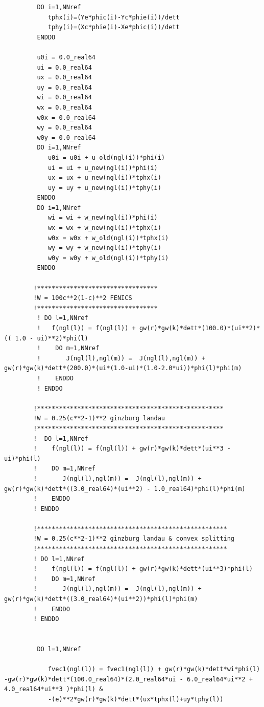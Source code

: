 \documentclass{article}
\begin{document}
\begin{verbatim}
         DO i=1,NNref
            tphx(i)=(Ye*phic(i)-Yc*phie(i))/dett
            tphy(i)=(Xc*phie(i)-Xe*phic(i))/dett
         ENDDO

         u0i = 0.0_real64
         ui = 0.0_real64
         ux = 0.0_real64
         uy = 0.0_real64
         wi = 0.0_real64
         wx = 0.0_real64
         w0x = 0.0_real64
         wy = 0.0_real64
         w0y = 0.0_real64
         DO i=1,NNref
            u0i = u0i + u_old(ngl(i))*phi(i)
            ui = ui + u_new(ngl(i))*phi(i) 
            ux = ux + u_new(ngl(i))*tphx(i)
            uy = uy + u_new(ngl(i))*tphy(i)
         ENDDO
         DO i=1,NNref
            wi = wi + w_new(ngl(i))*phi(i) 
            wx = wx + w_new(ngl(i))*tphx(i)
            w0x = w0x + w_old(ngl(i))*tphx(i)
            wy = wy + w_new(ngl(i))*tphy(i)
            w0y = w0y + w_old(ngl(i))*tphy(i)
         ENDDO
         
        !*********************************
        !W = 100c**2(1-c)**2 FENICS
        !*********************************  
         ! DO l=1,NNref
         !   f(ngl(l)) = f(ngl(l)) + gw(r)*gw(k)*dett*(100.0)*(ui**2)*(( 1.0 - ui)**2)*phi(l)
         !    DO m=1,NNref
         !       J(ngl(l),ngl(m)) =  J(ngl(l),ngl(m)) + gw(r)*gw(k)*dett*(200.0)*(ui*(1.0-ui)*(1.0-2.0*ui))*phi(l)*phi(m)
         !    ENDDO
         ! ENDDO

        !***************************************************
        !W = 0.25(c**2-1)**2 ginzburg landau 
        !*************************************************** 
        !  DO l=1,NNref
        !    f(ngl(l)) = f(ngl(l)) + gw(r)*gw(k)*dett*(ui**3 - ui)*phi(l)
        !    DO m=1,NNref
        !       J(ngl(l),ngl(m)) =  J(ngl(l),ngl(m)) + gw(r)*gw(k)*dett*((3.0_real64)*(ui**2) - 1.0_real64)*phi(l)*phi(m)
        !    ENDDO
        ! ENDDO
        
        !****************************************************
        !W = 0.25(c**2-1)**2 ginzburg landau & convex splitting
        !**************************************************** 
        ! DO l=1,NNref
        !    f(ngl(l)) = f(ngl(l)) + gw(r)*gw(k)*dett*(ui**3)*phi(l)
        !    DO m=1,NNref
        !       J(ngl(l),ngl(m)) =  J(ngl(l),ngl(m)) + gw(r)*gw(k)*dett*((3.0_real64)*(ui**2))*phi(l)*phi(m)
        !    ENDDO
        ! ENDDO

         
         DO l=1,NNref
            
            fvec1(ngl(l)) = fvec1(ngl(l)) + gw(r)*gw(k)*dett*wi*phi(l) -gw(r)*gw(k)*dett*(100.0_real64)*(2.0_real64*ui - 6.0_real64*ui**2 + 4.0_real64*ui**3 )*phi(l) &
            -(e)**2*gw(r)*gw(k)*dett*(ux*tphx(l)+uy*tphy(l))
           

\end{verbatim}
\end{document}
